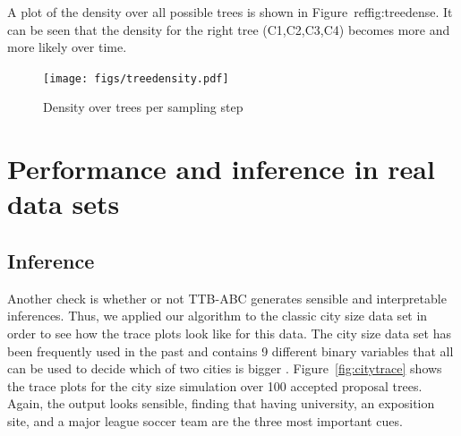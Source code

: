 \documentclass[a4paper,man, natbib]{apa6}
\begin{document}
A plot of the density over all possible trees is shown in Figure~ref{fig:treedense}. It can be seen that the density for the right tree (C1,C2,C3,C4) becomes more and more likely over time.

\begin{figure}[htb!]
  \caption{Density over trees per sampling step}
\label{fig:treedense}
  \centering
    \texttt{[image: figs/treedensity.pdf]}
\end{figure}


\section{Performance and inference in real data sets}


\subsection{Inference}
Another check is whether or not TTB-ABC generates sensible and interpretable inferences. Thus, we applied our algorithm to the classic city size data set in order to see how the trace plots look like for this data. The city size data set has been frequently used in the past and contains 9 different binary variables that all can be used to decide which of two cities is bigger \citep{chater2003fast, gigerenzer2009homo}. Figure~\ref{fig:citytrace} shows the trace plots for the city size simulation over 100 accepted proposal trees. Again, the output looks sensible, finding that having university, an exposition site, and a major league soccer team are the three most important cues.
\end{document}
